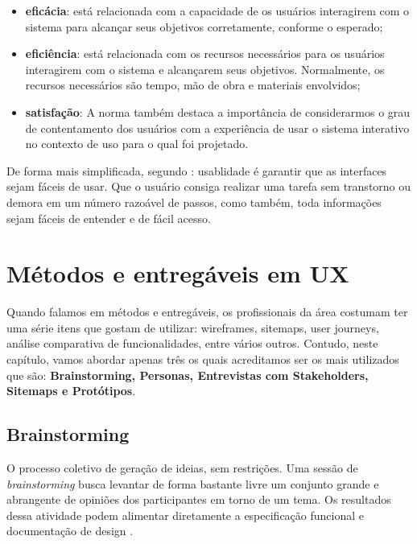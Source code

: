 \begin{itemize}
	\item \textbf{eficácia}: está relacionada com a capacidade de os usuários interagirem com o sistema para alcançar seus objetivos corretamente, conforme o esperado;
	
	\item \textbf{eficiência}:  está relacionada com os recursos necessários para os usuários
	interagirem com o sistema e alcançarem seus objetivos. Normalmente, os recursos
	necessários são tempo, mão de obra e materiais envolvidos; 
	
	\item \textbf{satisfação}: A norma também destaca
	a importância de considerarmos o grau de contentamento dos usuários com a experiência
	de usar o sistema interativo no contexto de uso para o qual foi projetado.
\end{itemize} 

De forma mais simplificada, segundo \cite{teixeira2014introduccao}: usablidade é garantir que as interfaces sejam fáceis de usar. Que o usuário consiga realizar uma tarefa sem transtorno ou demora em um número
razoável de passos, como também, toda informações sejam fáceis de entender e de fácil acesso. 

\section{Métodos e entregáveis em UX}

Quando falamos em métodos e entregáveis, os profissionais da área costumam ter uma série itens que gostam de utilizar: wireframes, sitemaps, user journeys, análise comparativa de funcionalidades, entre vários outros. Contudo, neste capítulo, vamos abordar apenas três os quais acreditamos ser os mais utilizados que são: \textbf{Brainstorming, Personas, Entrevistas com Stakeholders, Sitemaps e Protótipos}.

\subsection{Brainstorming}

O processo coletivo de geração de ideias, sem restrições. Uma sessão de \textit{brainstorming} busca levantar de forma bastante livre um conjunto grande e abrangente de opiniões dos
participantes em torno de um tema. Os resultados dessa atividade podem alimentar
diretamente a especificação funcional e documentação de design \cite{barbosa2010IHC}.

